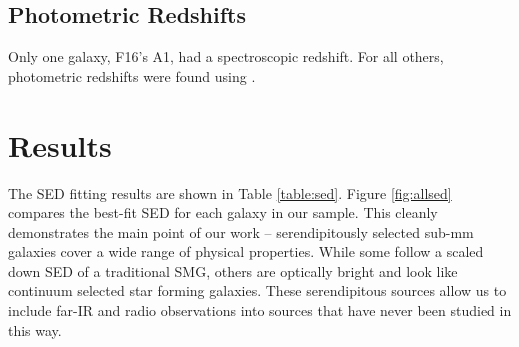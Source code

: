 \documentclass[preprint,natbib209]{aastex}
\begin{document}
\subsection{Photometric Redshifts}

Only one galaxy, F16's A1, had a spectroscopic redshift. For all others, photometric redshifts were found using \cite{eazy}.

\section{Results}
\label{sec:results}

The SED fitting results are shown in Table \ref{table:sed}. Figure \ref{fig:allsed} compares the best-fit SED for each galaxy in our sample. This cleanly demonstrates the main point of our work -- serendipitously selected sub-mm galaxies cover a wide range of physical properties. While some follow a scaled down SED of a traditional SMG, others are optically bright and look like continuum selected star forming galaxies. These serendipitous sources allow us to include far-IR and radio observations into sources that have never been studied in this way. 
\end{document}
